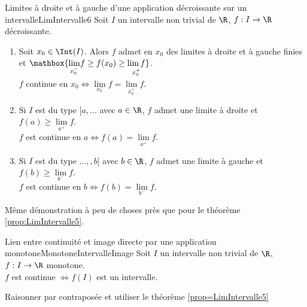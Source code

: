 \documentclass[12pt,a4paper]{report}
\begin{document}
\begin{theoreme}{Limites à droite et à gauche d'une application décroissante sur un intervalle}{LimIntervalle6}
Soit $I$ un intervalle non trivial de $\R$, $f : I \to \R$ décroissante. 
\begin{enumerate}
	\item Soit $x_0 \in \Int(I)$. Alors $f$ admet en $x_0$ des limites à droite et à gauche finies et $\mathbox{\underset{x_0^-}{\lim} f \geq f(x_0) \geq \underset{x_0^+}{\lim f}}$. \\
	$f$ continue en $x_0 \Longleftrightarrow \underset{x_0^-}{\lim} f = \underset{x_0^+}{\lim} f$.
	\item Si $I$ est du type $[a,...$ avec $a \in \R$, $f$ admet une limite à droite et $f(a) \geq \underset{a^+}{\lim} f$. \\
	$f$ est continue en $a \Longleftrightarrow f(a) = \underset{a^+}{\lim} f$.
	\item Si $I$ est du type $...,,b]$ avec $b \in \R$, $f$ admet une limite à gauche et $f(b) \geq \underset{b^-}{\lim} f$. \\
	$f$ est continue en $b \Longleftrightarrow f(b) = \underset{b^-}{\lim} f$.
\end{enumerate}
\end{theoreme}

\begin{principedemo}{}
Même démonstration à peu de choses près que pour le théorème \ref{prop:LimIntervalle5}.
\end{principedemo}

\begin{theoreme}{Lien entre continuité et image directe par une application monotone}{MonotoneIntervalleImage}
Soit $I$ un intervalle non trivial de $\R$, $f : I \to \R$ monotone. \\
$f$ est continue $\Longleftrightarrow f(I)$ est un intervalle.
\end{theoreme}

\begin{principedemo}{}
Raisonner par contraposée et utiliser le théorème \ref{prop=LimIntervalle5}
\end{principedemo}
\end{document}
